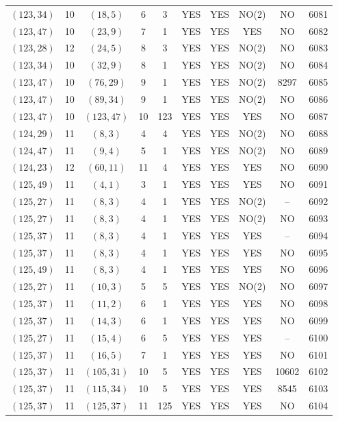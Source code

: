 \begin{longtable}{|c|c|c|c|c|c|c|c|c|c|}
$(123, 34)$ & 10 & $(18, 5)$ & 6 & 3 & YES & YES & NO(2) & NO & 6081\\
$(123, 47)$ & 10 & $(23, 9)$ & 7 & 1 & YES & YES & YES & NO & 6082\\
$(123, 28)$ & 12 & $(24, 5)$ & 8 & 3 & YES & YES & NO(2) & NO & 6083\\
$(123, 34)$ & 10 & $(32, 9)$ & 8 & 1 & YES & YES & NO(2) & NO & 6084\\
$(123, 47)$ & 10 & $(76, 29)$ & 9 & 1 & YES & YES & NO(2) & 8297 & 6085\\
$(123, 47)$ & 10 & $(89, 34)$ & 9 & 1 & YES & YES & NO(2) & NO & 6086\\
$(123, 47)$ & 10 & $(123, 47)$ & 10 & 123 & YES & YES & YES & NO & 6087\\
$(124, 29)$ & 11 & $(8, 3)$ & 4 & 4 & YES & YES & NO(2) & NO & 6088\\
$(124, 47)$ & 11 & $(9, 4)$ & 5 & 1 & YES & YES & NO(2) & NO & 6089\\
$(124, 23)$ & 12 & $(60, 11)$ & 11 & 4 & YES & YES & YES & NO & 6090\\
$(125, 49)$ & 11 & $(4, 1)$ & 3 & 1 & YES & YES & YES & NO & 6091\\
$(125, 27)$ & 11 & $(8, 3)$ & 4 & 1 & YES & YES & NO(2) & -- & 6092\\
$(125, 27)$ & 11 & $(8, 3)$ & 4 & 1 & YES & YES & NO(2) & NO & 6093\\
$(125, 37)$ & 11 & $(8, 3)$ & 4 & 1 & YES & YES & YES & -- & 6094\\
$(125, 37)$ & 11 & $(8, 3)$ & 4 & 1 & YES & YES & YES & NO & 6095\\
$(125, 49)$ & 11 & $(8, 3)$ & 4 & 1 & YES & YES & YES & NO & 6096\\
$(125, 27)$ & 11 & $(10, 3)$ & 5 & 5 & YES & YES & NO(2) & NO & 6097\\
$(125, 37)$ & 11 & $(11, 2)$ & 6 & 1 & YES & YES & YES & NO & 6098\\
$(125, 37)$ & 11 & $(14, 3)$ & 6 & 1 & YES & YES & YES & NO & 6099\\
$(125, 27)$ & 11 & $(15, 4)$ & 6 & 5 & YES & YES & YES & -- & 6100\\
$(125, 37)$ & 11 & $(16, 5)$ & 7 & 1 & YES & YES & YES & NO & 6101\\
$(125, 37)$ & 11 & $(105, 31)$ & 10 & 5 & YES & YES & YES & 10602 & 6102\\
$(125, 37)$ & 11 & $(115, 34)$ & 10 & 5 & YES & YES & YES & 8545 & 6103\\
$(125, 37)$ & 11 & $(125, 37)$ & 11 & 125 & YES & YES & YES & NO & 6104\\

\end{longtable}
